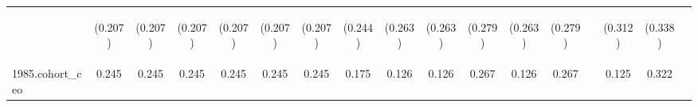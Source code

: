 \begin{center}
\begin{tabular}{lcccccccccccccccc}
\vspace{4pt} & \begin{footnotesize}(0.207)\end{footnotesize} & \begin{footnotesize}(0.207)\end{footnotesize} & \begin{footnotesize}(0.207)\end{footnotesize} & \begin{footnotesize}(0.207)\end{footnotesize} & \begin{footnotesize}(0.207)\end{footnotesize} & \begin{footnotesize}(0.207)\end{footnotesize} & \begin{footnotesize}(0.244)\end{footnotesize} & \begin{footnotesize}(0.263)\end{footnotesize} & \begin{footnotesize}(0.263)\end{footnotesize} & \begin{footnotesize}(0.279)\end{footnotesize} & \begin{footnotesize}(0.263)\end{footnotesize} & \begin{footnotesize}(0.279)\end{footnotesize} & \begin{footnotesize}\end{footnotesize} & \begin{footnotesize}(0.312)\end{footnotesize} & \begin{footnotesize}(0.338)\end{footnotesize} & \begin{footnotesize}\end{footnotesize} \\
1985.cohort\_ceo & 0.245 & 0.245 & 0.245 & 0.245 & 0.245 & 0.245 & 0.175 & 0.126 & 0.126 & 0.267 & 0.126 & 0.267 &  & 0.125 & 0.322 &  \\

\end{tabular}
\end{center}
